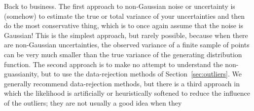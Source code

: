\documentclass[12pt,twoside]{article}
\newcommand{\sectionname}{Section}
\begin{document}
Back to business.  The first approach to non-Gaussian noise or
uncertainty is (somehow) to estimate the true or total variance of
your uncertainties and then do the most conservative thing, which is
to once again assume that the noise is Gaussian!  This is the simplest
approach, but rarely possible, because when there are non-Gaussian
uncertainties, the observed variance of a finite sample of points can
be very much smaller than the true variance of the generating
distribution function.  The second approach is to make no attempt to
understand the non-guassianity, but to use the data-rejection methods
of \sectionname~\ref{sec:outliers}.  We generally recommend
data-rejection methods, but there is a third approach in which the
likelihood is artificially or heuristically softened to reduce the
influence of the outliers; they are not usually a good idea when they
\end{document}
